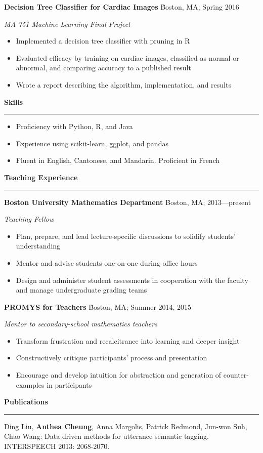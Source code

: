 \documentclass[letter, 10pt]{article}
\newcommand{\job}[5]{

    \begin{tabbing} {\large \bf #1} \` {#2; #3} \end{tabbing}
    \vspace{-0.2cm}
    \textit{#4}
	\vspace{-0.1cm}
    \begin{itemize}
    \setlength\itemsep{1pt}
      #5
    \end{itemize}
  
}
\newcommand{\heading}[1]{
	\vspace{0.2cm} 
	{\Large \textbf{#1}}\par
 \vspace{-0.2cm}\rule{\textwidth}{0.5pt}\par
 \vspace{-0.2cm}
	  }
\begin{document}
\job{Decision Tree Classifier for Cardiac Images}
	{Boston, MA}
	{Spring 2016}
	{MA 751 Machine Learning Final Project}{
	\item Implemented a decision tree classifier with pruning in R
	\item Evaluated efficacy by training on cardiac images, classified as normal or abnormal, and comparing accuracy to a published result
	\item Wrote a report describing the algorithm, implementation, and results
	}

\heading{Skills}

\begin{itemize}
\item Proficiency with Python, R, and Java
\item Experience using scikit-learn, ggplot, and pandas
\item Fluent in English, Cantonese, and Mandarin. Proficient in French
\end{itemize}


\heading{Teaching Experience}

\job{Boston University Mathematics Department}
    {Boston, MA}
    {2013---present}
    {Teaching Fellow}{
    \item Plan, prepare, and lead lecture-specific discussions to solidify
      students' understanding
    \item Mentor and advise students one-on-one during office hours
    \item Design and administer student assessments in cooperation with the
      faculty and manage undergraduate grading teams
}

\job{PROMYS for Teachers}
    {Boston, MA}
    {Summer 2014, 2015}
    {Mentor to secondary-school mathematics teachers}{
    \item Transform frustration and recalcitrance into learning and deeper insight
    \item Constructively critique participants' process and presentation
    \item Encourage and develop intuition for abstraction and generation of
      counter-examples in participants
}

\heading{Publications}

\vspace{0.2cm}\normalsize
Ding Liu, \textbf{Anthea Cheung}, Anna Margolis, Patrick Redmond, Jun-won Suh, Chao Wang: Data driven methods for utterance semantic tagging. INTERSPEECH 2013: 2068-2070.
\end{document}
